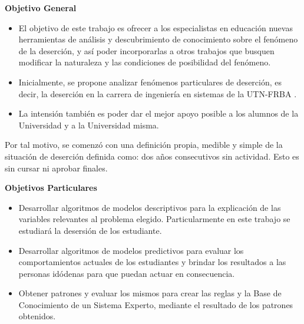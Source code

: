
\textbf{Objetivo General}\\
\begin{itemize}
	\item El objetivo de este trabajo es ofrecer a los especialistas en educación nuevas herramientas de análisis y descubrimiento de conocimiento sobre el fenómeno de la deserción, y así poder incorporarlas a otros trabajos que busquen modificar la naturaleza y las condiciones de posibilidad del fenómeno.
	\item Inicialmente, se propone analizar fenómenos particulares de deserción, es decir, la deserción en la carrera de ingeniería en sistemas de la UTN-FRBA .
	\item La intensión también es poder dar el mejor apoyo posible a los alumnos de la Universidad y a la Universidad misma.
\end{itemize}

Por tal motivo, se comenzó con una definición propia, medible y
simple de la situación de deserción definida como: dos años consecutivos sin actividad. Esto es sin cursar ni aprobar finales.


\textbf{Objetivos Particulares}
\begin{itemize}
	\item Desarrollar algoritmos de modelos descriptivos para la explicación de las variables relevantes al problema elegido. Particularmente en este trabajo se estudiará la desersión de los estudiante.
	\item Desarrollar algoritmos de modelos predictivos para evaluar los comportamientos actuales de los estudiantes y brindar los resultados a las personas idódenas para que puedan actuar en consecuencia.
	\item Obtener patrones y evaluar los mismos para crear las reglas y la Base de Conocimiento de un Sistema Experto, mediante el resultado de los patrones obtenidos.
\end{itemize}




